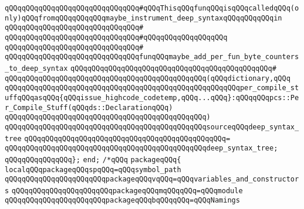 \newline
\verb|qQQqqQQqqQQqqQQqqQQqqQQqqQQqqQQq#qQQqThisqQQqfunqQQqisqQQqcalledqQQq(only)qQQqfromqQQqqQQqqQQqmaybe_instrument_deep_syntaxqQQqqQQqqQQqin|\newline
\verb|qQQqqQQqqQQqqQQqqQQqqQQqqQQqqQQq#|\newline
\verb|qQQqqQQqqQQqqQQqqQQqqQQqqQQqqQQq#qQQqqQQqqQQqqQQqqQQq|\newline
\verb|qQQqqQQqqQQqqQQqqQQqqQQqqQQqqQQq#|\newline
\verb|qQQqqQQqqQQqqQQqqQQqqQQqqQQqqQQqfunqQQqmaybe_add_per_fun_byte_counters_to_deep_syntax|\newline
\verb|qQQqqQQqqQQqqQQqqQQqqQQqqQQqqQQqqQQqqQQqqQQqqQQq#|\newline
\verb|qQQqqQQqqQQqqQQqqQQqqQQqqQQqqQQqqQQqqQQqqQQqqQQq(qQQqdictionary,qQQq|\newline
\verb|qQQqqQQqqQQqqQQqqQQqqQQqqQQqqQQqqQQqqQQqqQQqqQQqqQQqqQQqper_compile_stuffqQQqasqQQq{qQQqissue_highcode_codetemp,qQQq...qQQq}:qQQqqQQqpcs::Per_Compile_Stuff(qQQqds::DeclarationqQQq)|\newline
\verb|qQQqqQQqqQQqqQQqqQQqqQQqqQQqqQQqqQQqqQQqqQQqqQQq)|\newline
\verb|qQQqqQQqqQQqqQQqqQQqqQQqqQQqqQQqqQQqqQQqqQQqqQQqsourceqQQqdeep_syntax_tree|\newline
\verb|qQQqqQQqqQQqqQQqqQQqqQQqqQQqqQQqqQQqqQQqqQQqqQQq=|\newline
\verb|qQQqqQQqqQQqqQQqqQQqqQQqqQQqqQQqqQQqqQQqqQQqqQQqdeep_syntax_tree;|\newline
\verb|qQQqqQQqqQQqqQQq};|\newline
\verb|end;|\newline
\newline
\verb|/*qQQq|\newline
\newline
\verb|packageqQQq{|\newline
\newline
\verb|localqQQqpackageqQQqspqQQq=qQQqsymbol_path|\newline
\verb|qQQqqQQqqQQqqQQqqQQqqQQqpackageqQQqvqQQq=qQQqvariables_and_constructors|\newline
\verb|qQQqqQQqqQQqqQQqqQQqqQQqpackageqQQqmqQQqqQQq=qQQqmodule|\newline
\verb|qQQqqQQqqQQqqQQqqQQqqQQqpackageqQQqbqQQqqQQq=qQQqNamings|\newline

